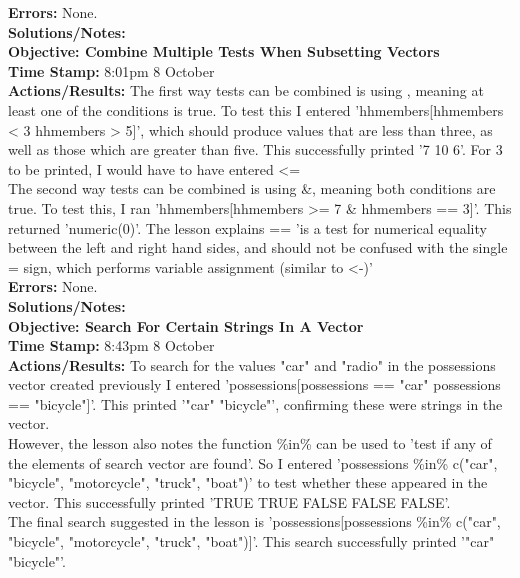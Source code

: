 \documentclass{article}
\begin{document}
\begin{FlushLeft}
\textbf{Errors:} None.\\
\textbf{Solutions/Notes:}\\
\vspace{5mm}
\textbf{Objective: Combine Multiple Tests When Subsetting Vectors}\\ 
\textbf{Time Stamp:} 8:01pm 8 October\\
\textbf{Actions/Results:} The first way tests can be combined is using \textbar{}, meaning at least one of the conditions is true. To test this I entered 'hh\textunderscore members[hh\textunderscore members \textless{} 3 \textbar{} hh\textunderscore members \textgreater{} 5]', which should produce values that are less than three, as well as those which are greater than five. This successfully printed '7 10 6'. For 3 to be printed, I would have to have entered \textless = \\
The second way tests can be combined is using \&, meaning both conditions are true. To test this, I ran 'hh\textunderscore members[hh\textunderscore members \textgreater = 7 \& hh\textunderscore members == 3]'. This returned 'numeric(0)'. The lesson explains == 'is a test for numerical equality between the left and right hand sides, and should not be confused with the single = sign, which performs variable assignment (similar to <-)'\\
\textbf{Errors:} None.\\
\textbf{Solutions/Notes:}\\
\vspace{5mm}
\textbf{Objective: Search For Certain Strings In A Vector}\\ 
\textbf{Time Stamp:} 8:43pm 8 October\\
\textbf{Actions/Results:} To search for the values "car" and "radio" in the possessions vector created previously I entered 'possessions[possessions == "car" \textbar{} possessions == "bicycle"]'. This printed '"car" "bicycle"', confirming these were strings in the vector.\\
However, the lesson also notes the function \%in\% can be used to 'test if any of the elements of search vector are found'. So I entered 'possessions \%in\% c("car", "bicycle", "motorcycle", "truck", "boat")' to test whether these appeared in the vector. This successfully printed 'TRUE TRUE FALSE FALSE FALSE'. \\
The final search suggested in the lesson is 'possessions[possessions \%in\% c("car", "bicycle", "motorcycle", "truck", "boat")]'. This search successfully printed '"car" "bicycle"'.\\

\end{FlushLeft}
\end{document}
